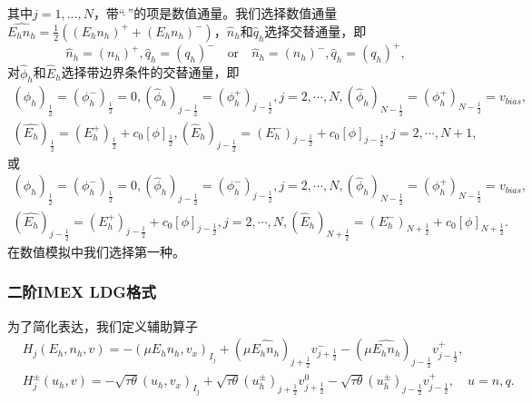 其中$j = 1,...,N$，带“$\widehat{\ }$”的项是数值通量。我们选择数值通量$\widehat{E_h n_h} = \frac{1}{2}((E_hn_h)^+  + (E_hn_h)^-)$，$\hat{n}_h$和$\hat{q}_h$选择交替通量，即
\begin{equation}
    \hat{n}_h = (n_h)^+, \hat{q}_h = (q_h)^- \quad \text{or} \quad \hat{n}_h = (n_h)^-, \hat{q}_h = (q_h)^+, \label{numbericalFlux:n&q}
\end{equation}
对$\hat{\phi}_h$和$\hat{E}_h$选择带边界条件的交替通量，即
\begin{equation}
    \begin{aligned}
        (\hat{\phi}_h)_{\frac{1}{2}} = (\phi_h^-)_{\frac{1}{2}} = 0, (\hat{\phi}_h)_{j-\frac{1}{2}} = (\phi_h^+)_{j-\frac{1}{2}},j = 2,\cdots,N,(\hat{\phi}_h)_{N-\frac{1}{2}} = (\phi_h^+)_{N-\frac{1}{2}} = v_{bias}, \\
        (\hat{E_h})_{\frac{1}{2}} = (E_h^+)_{\frac{1}{2}} + c_0[\phi]_{\frac{1}{2}}, (\hat{E}_h)_{j-\frac{1}{2}} = (E_h^-)_{j-\frac{1}{2}} + c_0[\phi]_{j-\frac{1}{2}},j = 2,\cdots,N+1,
    \end{aligned}\label{numbericalFlux:phi&E}
\end{equation}
或
\begin{equation}
    \begin{aligned}
        (\hat{\phi}_h)_{\frac{1}{2}} = (\phi_h^-)_{\frac{1}{2}} = 0, (\hat{\phi}_h)_{j-\frac{1}{2}} = (\phi_h^-)_{j-\frac{1}{2}},j = 2,\cdots,N,(\hat{\phi}_h)_{N-\frac{1}{2}} = (\phi_h^+)_{N-\frac{1}{2}} = v_{bias}, \\
        (\hat{E_h})_{j - \frac{1}{2}} = (E_h^+)_{j - \frac{1}{2}} + c_0[\phi]_{j-\frac{1}{2}},j = 2,\cdots,N, (\hat{E}_h)_{N+\frac{1}{2}} = (E_h^-)_{N+\frac{1}{2}} + c_0[\phi]_{N+\frac{1}{2}}.
    \end{aligned}\label{numbericalFlux:phi&E:alt}
\end{equation}
在数值模拟中我们选择第一种。
\subsubsection{二阶IMEX LDG格式}
为了简化表达，我们定义辅助算子
\begin{align}
     & H_j(E_h,n_h,v)    = - (\mu E_h n_h, v_x)_{I_j} + (\mu \hat{E_h n_h})_{j+\frac{1}{2}}v_{j+\frac{1}{2}}^- - (\mu \hat{E_h n_h})_{j-\frac{1}{2}}v_{j-\frac{1}{2}}^+, \label{eq:IMEX:DD:notation:1}                                        \\
     & H_j^{\pm}(u_h,v)  =- \sqrt{\tau \theta}(u_h,v_x)_{I_j} + \sqrt{\tau\theta}(u_h^{\pm})_{j+\frac{1}{2}}v_{j+\frac{1}{2}}^0 - \sqrt{\tau\theta}(u_h^{\pm})_{j-\frac{1}{2}}v_{j-\frac{1}{2}}^+,\quad u = n,q.\label{eq:IMEX:DD:notation:2}
\end{align}

